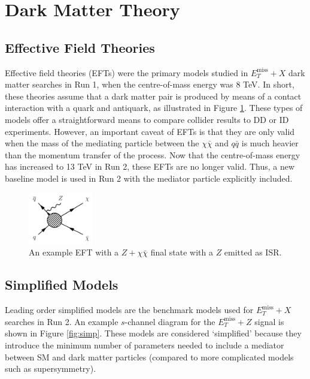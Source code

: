 \label{chapter:theory}

\section{Dark Matter Theory}

\subsection{Effective Field Theories}

Effective field theories (EFTs) were the primary models studied in $E_T^\text{miss}+X$ dark matter searches in Run 1, when the centre-of-mass energy was 8 TeV. In short, these theories assume that a dark matter pair is produced by means of a contact interaction with a quark and antiquark, as illustrated in Figure \ref{fig:eft}. These types of models offer a straightforward means to compare collider results to DD or ID experiments. However, an important caveat of EFTs is that they are only valid when the mass of the mediating particle between the $\chi\bar{\chi}$ and $q\bar{q}$ is much heavier than the momentum transfer of the process. Now that the centre-of-mass energy has increased to 13 TeV in Run 2, these EFTs are no longer valid. Thus, a new baseline model is used in Run 2 with the mediator particle explicitly included.

\begin{figure}[htb]
\centering
\includegraphics[width=0.25\textwidth]{Figures/eft.png}
\caption{An example EFT with a $Z+\chi\bar{\chi}$ final state with a $Z$ emitted as ISR.}
\label{fig:eft}
\end{figure}

\subsection{Simplified Models}

Leading order simplified models are the benchmark models used for $E_T^\text{miss}+X$ searches in Run 2. An example $s$-channel diagram for the $E_T^\text{miss}+Z$ signal is shown in Figure \ref{fig:simp}. These models are considered `simplified' because they introduce the minimum number of parameters needed to include a mediator between SM and dark matter particles (compared to more complicated models such as supersymmetry). 

